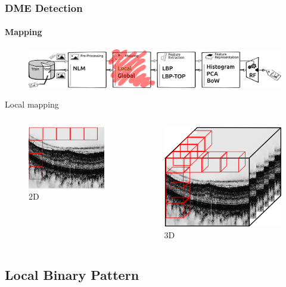 \documentclass{beamer}
\begin{document}
\begin{frame}
  \frametitle{DME Detection}
  \framesubtitle{Mapping}
  \begin{figure}
    \centering
    \includegraphics[width=.5\textwidth]{./images/ml-map1.png}
  \end{figure}
  \begin{block}{Local mapping}
    \begin{columns}
      \begin{column}{.5\linewidth}
        \begin{figure}
          \centering
          \includegraphics[width=.3\textwidth]{./images/local-2d.png}
          \caption{2D}
        \end{figure}
      \end{column}
      \begin{column}{.5\linewidth}
        \begin{figure}
          \centering
          \includegraphics[width=.3\textwidth]{./images/local-3d.png}
          \caption{3D}
        \end{figure}
      \end{column}
    \end{columns}
  \end{block}
\end{frame}

\subsection{Local Binary Pattern}
\end{document}
